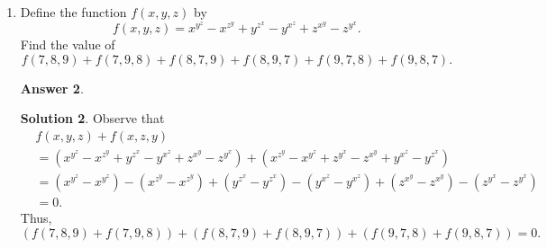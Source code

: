 \documentclass[11pt]{article}
\theoremstyle{definition}
\newtheorem*{solution}{Solution}
\newtheorem*{answer}{Answer}
\begin{document}
\begin{enumerate}
\begin{answer}
\end{answer}

\begin{solution}
The total number of possible combinations that Zalec can choose without enforcing the restriction is $\binom{10}{3} = 120$. By imposing the non-consecutive restriction, we can "take out" two numbers, working instead from 1 to 8. Whatever numbers we choose, we can add 1 to the second-largest number and 2 to the largest number. For example, if we choose 1,7, and 8 from this, this would turn into 1, 8, and 10, etc. Therefore, our answer is $\frac{\binom{8}{3}}{\binom{10}{3}} = \frac{56}{120} = \frac{7}{15}$. 

\end{solution}

\item Define the function $f(x, y, z)$ by\[f(x, y, z) = x^{y^z} - x^{z^y} + y^{z^x} - y^{x^z} + z^{x^y} - z^{y^x}.\]Find the value of\[f(7, 8, 9) + f(7, 9, 8) + f(8, 7, 9) + f(8, 9, 7) + f(9, 7, 8) + f(9, 8, 7).\]


\begin{answer}
\end{answer}

\begin{solution}
Observe that
\begin{align*}
&f(x, y, z) + f(x, z, y) \\&= (x^{y^z} - x^{z^y} + y^{z^x} - y^{x^z} + z^{x^y} - z^{y^x}) + (x^{z^y} - x^{y^z} + z^{y^x} - z^{x^y} + y^{x^z} - y^{z^x}) \\&= (x^{y^z} - x^{y^z}) - (x^{z^y} - x^{z^y}) + (y^{z^x} - y^{z^x}) - (y^{x^z} - y^{x^z}) + (z^{x^y} - z^{x^y}) - (z^{y^x} - z^{y^x}) \\&= 0.
\end{align*}
Thus,\[(f(7, 8, 9) + f(7, 9, 8)) + (f(8, 7, 9) + f(8, 9, 7)) + (f(9, 7, 8) + f(9, 8, 7)) = 0.\]

\end{solution}

\end{enumerate}


\eject
\end{document}
